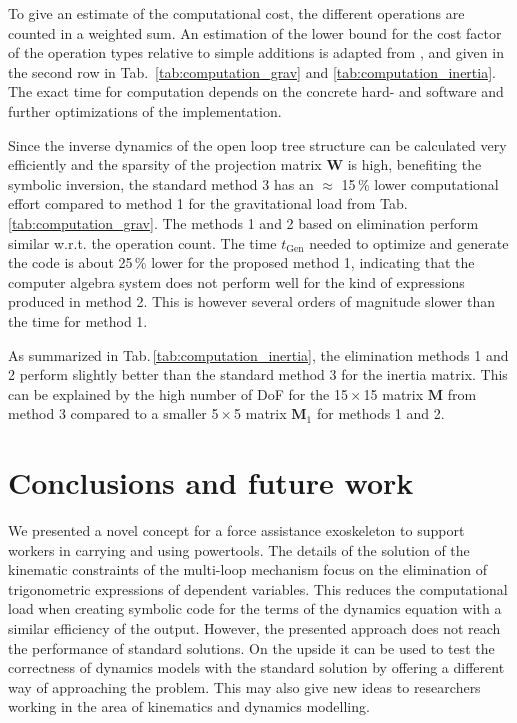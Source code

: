 \documentclass[twocolumn,10pt]{IFTOMM}
\newcommand{\bm}[1]{\boldsymbol{#1}}
\begin{document}
To give an estimate of the computational cost, the different operations are counted in a weighted sum. An estimation of the lower bound for the cost factor of the operation types relative to simple additions is adapted from \cite{Atkinson2014}, \cite{Hindriksen2012} and given in the second row in Tab.\, \ref{tab:computation_grav} and \ref{tab:computation_inertia}.
The exact time for computation depends on the concrete hard- and software and further optimizations of the implementation.

Since the inverse dynamics of the open loop tree structure can be calculated very efficiently and the sparsity of the projection matrix $\bm{W}$ is high, benefiting the symbolic inversion, the standard method 3 has an $\approx$ 15\,\% lower computational effort compared to method 1 for the gravitational load from Tab.\,\ref{tab:computation_grav}.
The methods 1 and 2 based on elimination perform similar w.r.t. the operation count.
The time $t_{\mathrm{Gen}}$ needed to optimize and generate the code is about 25\,\% lower for the proposed method 1, indicating that the computer algebra system does not perform well for the kind of expressions produced in method 2.
This is however several orders of magnitude slower than the time for method 1.

As summarized in Tab.\,\ref{tab:computation_inertia}, the elimination methods 1 and 2 perform slightly better than the standard method 3 for the inertia matrix.
This can be explained by the high number of DoF for the 15\,$\times$\,15 matrix $\bm{M}$ from method 3 compared to a smaller 5\,$\times$\,5 matrix $\bm{M}_1$ for methods 1 and 2.

\section{Conclusions and future work}
\label{sec:conclusion}

We presented a novel concept for a force assistance exoskeleton to support workers in carrying and using powertools.
The details of the solution of the kinematic constraints of the multi-loop mechanism focus on the elimination of trigonometric expressions of dependent variables.
This reduces the computational load when creating symbolic code for the terms of the dynamics equation with a similar efficiency of the output.
However, the presented approach does not reach the performance of standard solutions.
On the upside it can be used to test the correctness of dynamics models with the standard solution by offering a different way of approaching the problem.
This may also give new ideas to researchers working in the area of kinematics and dynamics modelling.
\end{document}
